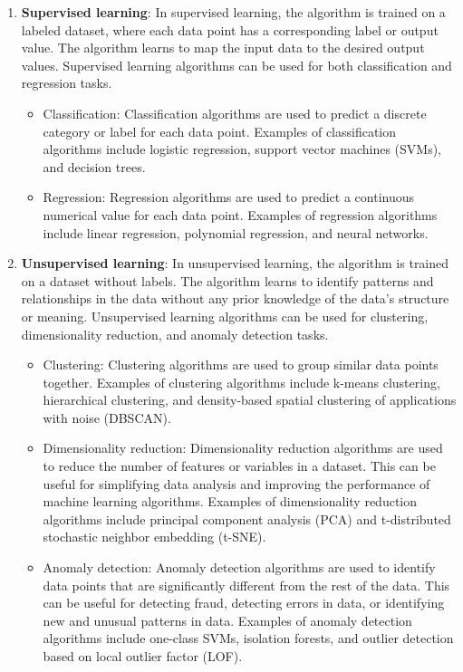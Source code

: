 \begin{enumerate}
    \item \textbf{Supervised learning}: In supervised learning, the algorithm is trained on a labeled dataset, where each data point has a corresponding label or output value. The algorithm learns to map the input data to the desired output values. Supervised learning algorithms can be used for both classification and regression tasks.

\begin{itemize}
        \item Classification: Classification algorithms are used to predict a discrete category or label for each data point. Examples of classification algorithms include logistic regression, support vector machines (SVMs), and decision trees.

        \item Regression: Regression algorithms are used to predict a continuous numerical value for each data point. Examples of regression algorithms include linear regression, polynomial regression, and neural networks.

\end{itemize}

    \item \textbf{Unsupervised learning}: In unsupervised learning, the algorithm is trained on a dataset without labels. The algorithm learns to identify patterns and relationships in the data without any prior knowledge of the data's structure or meaning. Unsupervised learning algorithms can be used for clustering, dimensionality reduction, and anomaly detection tasks.

\begin{itemize}
        \item Clustering: Clustering algorithms are used to group similar data points together. Examples of clustering algorithms include k-means clustering, hierarchical clustering, and density-based spatial clustering of applications with noise (DBSCAN).

        \item Dimensionality reduction: Dimensionality reduction algorithms are used to reduce the number of features or variables in a dataset. This can be useful for simplifying data analysis and improving the performance of machine learning algorithms. Examples of dimensionality reduction algorithms include principal component analysis (PCA) and t-distributed stochastic neighbor embedding (t-SNE).

        \item Anomaly detection: Anomaly detection algorithms are used to identify data points that are significantly different from the rest of the data. This can be useful for detecting fraud, detecting errors in data, or identifying new and unusual patterns in data. Examples of anomaly detection algorithms include one-class SVMs, isolation forests, and outlier detection based on local outlier factor (LOF).


\end{itemize}
\end{enumerate}

